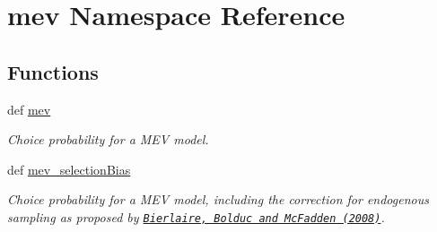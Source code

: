 \hypertarget{namespacemev}{\section{mev Namespace Reference}
\label{namespacemev}
}
\subsection*{Functions}
\begin{DoxyCompactItemize}
\item 
def \hyperlink{group__models_ga9f62049fa1c5836071328e800dbc30dd}{mev}
\begin{DoxyCompactList}\small\item\em Choice probability for a M\+E\+V model. \end{DoxyCompactList}\item 
def \hyperlink{group__models_gaa009fc631ba3993ae2092ef250dbb68f}{mev\+\_\+selection\+Bias}
\begin{DoxyCompactList}\small\item\em Choice probability for a M\+E\+V model, including the correction for endogenous sampling as proposed by \href{http://dx.doi.org/10.1016/j.trb.2007.09.003}{\tt Bierlaire, Bolduc and Mc\+Fadden (2008)}. \end{DoxyCompactList}\end{DoxyCompactItemize}
